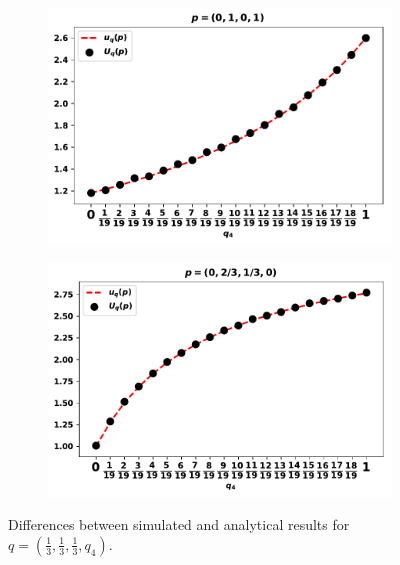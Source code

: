 \documentclass[10pt]{article}
\begin{document}
\begin{figure}[!htbp]
    \begin{center}
        \begin{subfigure}{0.45\textwidth}
            \includegraphics[width=\linewidth]{img/validation_against_player_one.pdf}
        \end{subfigure}
        \begin{subfigure}{0.45\textwidth}
            \includegraphics[width=\linewidth]{img/validation_against_player_two.pdf}
        \end{subfigure}
    \end{center}

    \caption{Differences between simulated and analytical results for
            \(q = (\frac{1}{3}, \frac{1}{3}, \frac{1}{3}, q_4)\).}
    \label{fig:analytical_simulated}
\end{figure}
\end{document}
